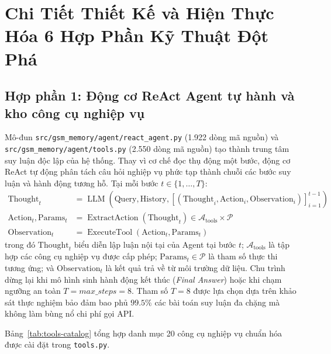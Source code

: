\documentclass[a4paper,11pt]{article}
\begin{document}
\clearpage
\section{Chi Tiết Thiết Kế và Hiện Thực Hóa 6 Hợp Phần Kỹ Thuật Đột Phá}
\label{sec:components}

\subsection{Hợp phần 1: Động cơ ReAct Agent tự hành và kho công cụ nghiệp vụ}
\label{sec:react-agent}

Mô-đun \nolinkurl{src/gsm_memory/agent/react_agent.py} (1.922 dòng mã nguồn) và \nolinkurl{src/gsm_memory/agent/tools.py} (2.550 dòng mã nguồn) tạo thành trung tâm suy luận độc lập của hệ thống. Thay vì cơ chế đọc thụ động một bước, động cơ ReAct tự động phân tách câu hỏi nghiệp vụ phức tạp thành chuỗi các bước suy luận và hành động tương hỗ. Tại mỗi bước $t \in \{1, \dots, T\}$:
\begin{align}
    \text{Thought}_t &= \operatorname{LLM}\left(\text{Query}, \text{History}, [(\text{Thought}_i, \text{Action}_i, \text{Observation}_i)]_{i=1}^{t-1}\right) \label{eq:react-thought} \\
    \text{Action}_t, \text{Params}_t &= \operatorname{ExtractAction}(\text{Thought}_t) \in \mathcal{A}_{\text{tools}} \times \mathcal{P} \label{eq:react-action} \\
    \text{Observation}_t &= \operatorname{ExecuteTool}(\text{Action}_t, \text{Params}_t) \label{eq:react-obs}
\end{align}
trong đó $\text{Thought}_t$ biểu diễn lập luận nội tại của Agent tại bước $t$; $\mathcal{A}_{\text{tools}}$ là tập hợp các công cụ nghiệp vụ được cấp phép; $\text{Params}_t \in \mathcal{P}$ là tham số thực thi tương ứng; và $\text{Observation}_t$ là kết quả trả về từ môi trường dữ liệu. Chu trình dừng lại khi mô hình sinh hành động kết thúc (\textit{Final Answer}) hoặc khi chạm ngưỡng an toàn $T = max\_steps = 8$. Tham số $T = 8$ được lựa chọn dựa trên khảo sát thực nghiệm bảo đảm bao phủ $99.5\%$ các bài toán suy luận đa chặng mà không làm bùng nổ chi phí gọi API.

Bảng~\ref{tab:tools-catalog} tổng hợp danh mục 20 công cụ nghiệp vụ chuẩn hóa được cài đặt trong \nolinkurl{tools.py}.
\end{document}

